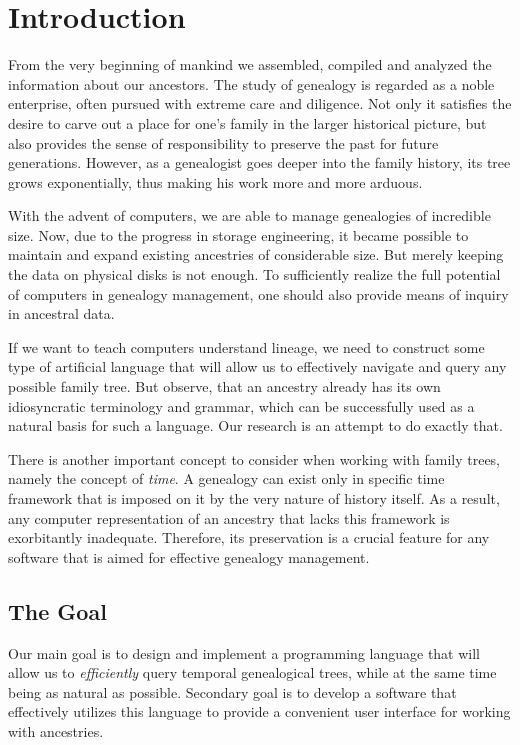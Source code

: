 \chapter{Introduction}
\label{chap:intro}
    From the very beginning of mankind we assembled, compiled and analyzed the information about our ancestors. The study of genealogy
    is regarded as a noble enterprise, often pursued with extreme care and diligence. Not only it satisfies the desire to carve out a
    place for one's family in the larger historical picture, but also provides the sense of responsibility to preserve the past for
    future generations. However, as a genealogist goes deeper into the family history, its tree grows exponentially, thus making his
    work more and more arduous.

    With the advent of computers, we are able to manage genealogies of incredible size. Now, due to the progress in storage
    engineering, it became possible to maintain and expand existing ancestries of considerable size. But merely keeping the data on
    physical disks is not enough. To sufficiently realize the full potential of computers in genealogy management, one should
    also provide means of inquiry in ancestral data.

    If we want to teach computers understand lineage, we need to construct some type of artificial language that will allow us to
    effectively navigate and query any possible family tree. But observe, that an ancestry already has its own idiosyncratic
    terminology and grammar, which can be successfully used as a natural basis for such a language. Our research is an attempt to do
    exactly that.

    There is another important concept to consider when working with family trees, namely the concept of \textit{time}. A genealogy
    can exist only in specific time framework that is imposed on it by the very nature of history itself. As a result, any computer
    representation of an ancestry that lacks this framework is exorbitantly inadequate. Therefore, its preservation is a crucial
    feature for any software that is aimed for effective genealogy management.

\section{The Goal}
    Our main goal is to design and implement a programming language that will allow us to \textit{efficiently} query temporal genealogical
    trees, while at the same time being as natural as possible. Secondary goal is to develop a software that effectively utilizes this
    language to provide a convenient user interface for working with ancestries.

